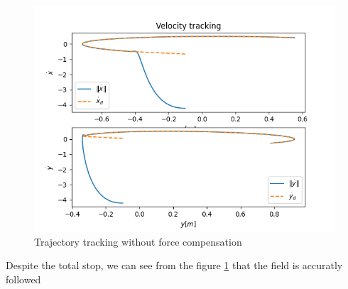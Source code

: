\begin{figure}[h!]
   \centering
   \includegraphics[width=\linewidth]{Images/velocitytrackingpythonnocomp.png}
   \caption{Trajectory tracking without force compensation }
   \label{fig:trajtracknocomp}
\end{figure}

Despite the total stop, we can see from the figure \ref{fig:trajtracknocomp} that the field is accuratly followed
